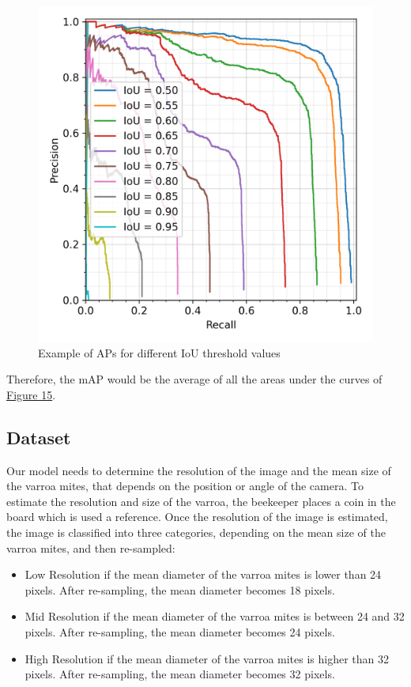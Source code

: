 \documentclass{article}
\begin{document}
\begin{figure}[!ht]
  \centering
  \includegraphics[scale=0.75]{metrics/mAP.png}
  \caption{Example of APs for different IoU threshold values}
  \label{Figure 15}
\end{figure}

\bigskip

Therefore, the mAP would be the average of all the areas under the curves of \hyperref[Figure 15]{Figure 15}.

\subsection{Dataset}

Our model needs to determine the resolution of the image and the mean size of the varroa mites, that depends on the position or angle of the camera. To estimate the resolution and size of the varroa,  the beekeeper places a  coin in the board which is used a reference. Once the resolution of the image is estimated, the image is classified into three categories, depending on the mean size  of the varroa mites, and then re-sampled: 

\begin{itemize}

    \item Low Resolution if the mean diameter of the varroa mites is lower than 24 pixels. After re-sampling, the mean diameter becomes 18 pixels.
    \item Mid Resolution if the mean diameter of the varroa mites is between 24 and 32 pixels. After re-sampling, the mean diameter becomes 24 pixels.
    \item High Resolution if the mean diameter of the varroa mites is higher than 32 pixels. After re-sampling, the mean diameter becomes 32 pixels.
\end{itemize}
\end{document}
